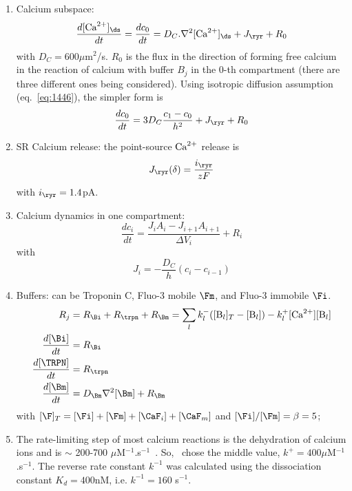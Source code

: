 \begin{enumerate}
\item Calcium subspace:
  \begin{equation}
    \label{eq:1443}
    \frac{d[\Ca]_\ds}{dt} = \frac{dc_0}{dt} = D_C.\nabla^2[\Ca]_\ds + J_\ryr +
    R_0
  \end{equation}
  with $D_C=600\mu$m$^2$/s. $R_0$ is the flux in the direction of
  forming free calcium in the reaction of calcium with buffer $B_j$ in
  the 0-th compartment (there are three different ones being
  considered). Using isotropic diffusion assumption
  (eq.~\eqref{eq:1446}), the simpler form is
  \begin{equation}
    \label{eq:1450}
    \frac{dc_0}{dt} = 3D_C\frac{c_1-c_0}{h^2} + J_\ryr + R_0
  \end{equation}


\item SR Calcium release: the point-source ${\text{Ca}^{2+}}$ release is
  \begin{equation}
    \label{eq:1445}
    J_\ryr(\delta) = \frac{i_\ryr}{zF}
  \end{equation}
  with $i_\ryr = 1.4$pA.


\item Calcium dynamics in one compartment:
  \begin{equation}
    \label{eq:1446}
    \frac{dc_i}{dt} = \frac{J_iA_i-J_{i+1}A_{i+1}}{\Delta V_i} +
    R_i
  \end{equation}
  with
  \begin{equation}
    \label{eq:1447}
    J_i = -\frac{D_C}{h}(c_{i}-c_{i-1})
  \end{equation}

\item Buffers: can be Troponin C, Fluo-3 mobile $\Fm$, and Fluo-3
  immobile $\Fi$.
  \begin{equation}
    \label{eq:1444}
    \begin{split}
      R_j &= R_\Bi + R_\trpn + R_\Bm = \sum_l k^-_l ([\B_l]_T-[\B_l]) - k^+_l[\Ca][\B_l] \\
      \frac{d[\Bi]}{dt} &= R_\Bi \\
      \frac{d[\TRPN]}{dt} &= R_\trpn \\
      \frac{d[\Bm]}{dt} &= D_\Bm \nabla^2[\Bm] + R_\Bm
    \end{split}
  \end{equation}
  with $[\F]_T=[\Fi]+[\Fm]+[\CaF_i]+[\CaF_m]$ and
  $[\Fi]/[\Fm]=\beta=5$; 

\item The rate-limiting step of most calcium reactions is the
  dehydration of calcium ions and is $\sim$ 200-700
  $\mu$M$^{-1}$.s$^{-1}$~\citep{hague1977}. So,~\citep{izu1998} chose
  the middle value, $k^+=400\mu$M$^{-1}$.s$^{-1}$. The reverse rate
  constant $k^{-1}$ was calculated using the dissociation constant
  $K_d=400$nM, i.e. $k^{-1}=160$ s$^{-1}$.


\end{enumerate}
